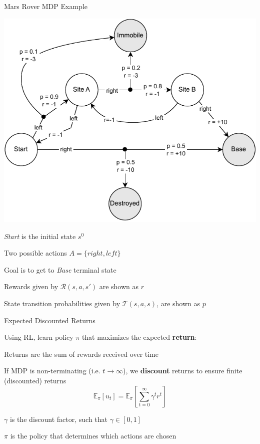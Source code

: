\begin{frame}[t]{Mars Rover MDP Example}
	\vspace{10pt}
	
    \bcol
    
          \includegraphics[width=1\textwidth]{images/chapter_2/mdp-rover.pdf}
    
      \small
        \blist
          \item \textit{Start} is the initial state \(s^0\)
          \item Two possible actions \(A = \{right, left\}\)
          \item Goal is to get to \textit{Base} terminal state
          \item Rewards given by $\mathcal{R}(s, a, s')$ are shown as $r$
          \item State transition probabilities given by $\mathcal{T}(s, a, s)$, are shown as $p$
        \elist
    
    \ecol
\end{frame}

\begin{frame}{Expected Discounted Returns}

    Using RL, learn policy $\pi$ that maximizes the expected \textbf{return}:

    \blist
        \item Returns are the sum of rewards received over time
        \item If MDP is non-terminating (i.e. $t \to \infty$), we \textbf{discount} returns to ensure finite (discounted) returns
    \elist
    \vspace{0pt}
    $$
    \mathbb{E}_{\pi}[u_{t}] = \mathbb{E}_{\pi}\left[\sum_{t=0}^{\infty}\gamma^t r^t\right]
    $$

    \blist
        \item $\gamma$ is the discount factor, such that $\gamma \in [0, 1]$
        \item $\pi$ is the policy that determines which actions are chosen
    \elist
\end{frame}

